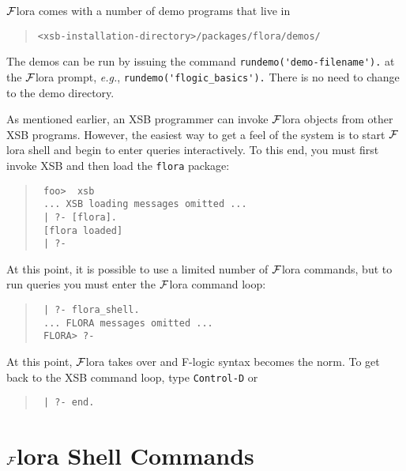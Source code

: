 \documentclass[11pt]{article}
\newcommand{\FLORA}{{\mbox{${\cal F}${\sc lora}}}\xspace}
\newcommand{\fl}{{F-logic}\xspace}
\begin{document}
\FLORA comes with a number of demo programs that live in
\begin{quote}
 \verb|<xsb-installation-directory>/packages/flora/demos/|  
\end{quote}
The demos can be run by issuing the command
\verb|rundemo('demo-filename').| at the \FLORA prompt, {\it e.g.},
\verb|rundemo('flogic_basics').|
There is no need to change to the demo directory.

As mentioned earlier, an XSB programmer can invoke \FLORA objects from
other XSB programs. However, the easiest way to get a feel of the system
is to start \FLORA shell and begin to enter queries interactively.  To
this end, you must first invoke XSB and then load the {\tt flora}
package:
\begin{quote}
  \tt
foo>~~xsb  \\
\tt
... XSB loading messages omitted ...\\
\tt
| ?- [flora].\\
\tt
[flora loaded]\\
\tt
| ?-
\end{quote}
At this point, it is possible to use a limited number of \FLORA
commands, but to run queries you must enter the \FLORA command loop:
\begin{quote}
  \tt
| ?- flora\_shell.  \\
 \tt
... FLORA messages omitted ... \\
 \tt
FLORA> ?-
\end{quote}

At this point, \FLORA takes over and \fl syntax becomes the
norm. To get back to the XSB command loop, type {\tt Control-D} or 
\begin{quote}
  \tt
| ?- end.  
\end{quote}

\section{\FLORA Shell Commands} \label{sec-shell-commands}
\end{document}
